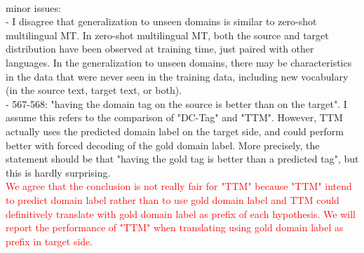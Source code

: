 \documentclass[12pt,times,a4paper,twoside]{article}
\theoremstyle{definition}
\begin{document}
\\
minor issues:
\\
- I disagree that generalization to unseen domains is similar to zero-shot multilingual MT. In zero-shot multilingual MT, both the source and target distribution have been observed at training time, just paired with other languages. In the generalization to unseen domains, there may be characteristics in the data that were never seen in the training data, including new vocabulary (in the source text, target text, or both).
\\
- 567-568: "having the domain tag on the source is better than on the
target". I assume this refers to the comparison of "DC-Tag" and "TTM". However, TTM actually uses the predicted domain label on the target side, and could perform better with forced decoding of the gold domain label. More precisely, the statement should be that "having the gold tag is better than a predicted tag", but this is hardly surprising.
\\
\textcolor{red}{We agree that the conclusion is not really fair for "TTM" because "TTM" intend to predict domain label rather than to use gold domain label and TTM could definitively translate with gold domain label as prefix of each hypothesis. We will report the performance of "TTM" when translating using gold domain label as prefix in target side.}
\end{document}
